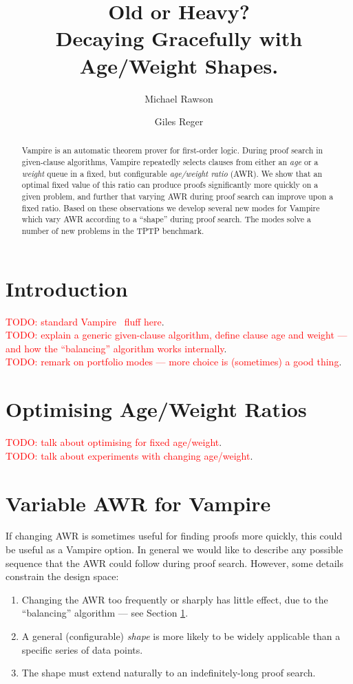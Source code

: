 \documentclass{llncs}
\title{Old or Heavy?\\Decaying Gracefully with Age/Weight Shapes.}
\author{Michael Rawson \and Giles Reger}
\institute{University of Manchester, Manchester, UK}
\newcommand{\todo}[1]{\textcolor{red}{TODO: #1}}
\begin{document}
\maketitle
\begin{abstract}
Vampire is an automatic theorem prover for first-order logic.
During proof search in given-clause algorithms, Vampire repeatedly selects clauses from either an \emph{age} or a \emph{weight} queue in a fixed, but configurable \emph{age/weight ratio} (AWR).
We show that an optimal fixed value of this ratio can produce proofs significantly more quickly on a given problem, and further that varying AWR during proof search can improve upon a fixed ratio.
Based on these observations we develop several new modes for Vampire which vary AWR according to a ``shape'' during proof search.
The modes solve a number of new problems in the TPTP benchmark.
\end{abstract}

\section{Introduction}
\label{sec:introduction}
\todo{standard Vampire~\cite{vampire} fluff here}.\\
\todo{explain a generic given-clause algorithm, define clause age and weight --- and how the ``balancing'' algorithm works internally}.\\
\todo{remark on portfolio modes --- more choice is (sometimes) a good thing}.

\section{Optimising Age/Weight Ratios}
\todo{talk about optimising for fixed age/weight}.\\
\todo{talk about experiments with changing age/weight}.

\section{Variable AWR for Vampire}
If changing AWR is sometimes useful for finding proofs more quickly, this could be useful as a Vampire option.
In general we would like to describe any possible sequence that the AWR could follow during proof search.
However, some details constrain the design space:
\begin{enumerate}
	\item Changing the AWR too frequently or sharply has little effect, due to the ``balancing'' algorithm --- see Section \ref{sec:introduction}.
	\item A general (configurable) \emph{shape} is more likely to be widely applicable than a specific series of data points.
	\item The shape must extend naturally to an indefinitely-long proof search.
\end{enumerate}
\end{document}
